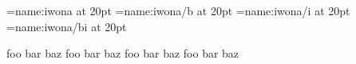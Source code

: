 \ifdefined\directlua
  
\fi

\font\iwona           =name:iwona      at 20pt
\font\iwonabold       =name:iwona/b    at 20pt
\font\iwonaitalic     =name:iwona/i    at 20pt
\font\iwonabolditalic =name:iwona/bi   at 20pt

\def\test{foo bar baz \endgraf}
{\iwona           \test}
{\iwonabold       \test}
{\iwonaitalic     \test}
{\iwonabolditalic \test}
\bye
